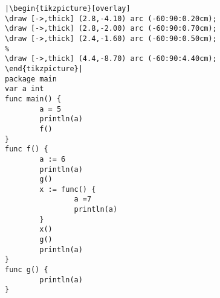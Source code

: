 \begin{lstlisting}[caption=Scope and function literals,label=src:scope3]
|\begin{tikzpicture}[overlay]
\draw [->,thick] (2.8,-4.10) arc (-60:90:0.20cm);
\draw [->,thick] (2.8,-2.00) arc (-60:90:0.70cm);
\draw [->,thick] (2.4,-1.60) arc (-60:90:0.50cm);
%
\draw [->,thick] (4.4,-8.70) arc (-60:90:4.40cm);
\end{tikzpicture}|
package main
var a int
func main() {
        a = 5
        println(a)
        f()
}
func f() {
        a := 6
        println(a)
        g()
        x := func() {
                a =7
                println(a)
        }
        x()
        g()
        println(a)
}
func g() {
        println(a)
}
\end{lstlisting}
